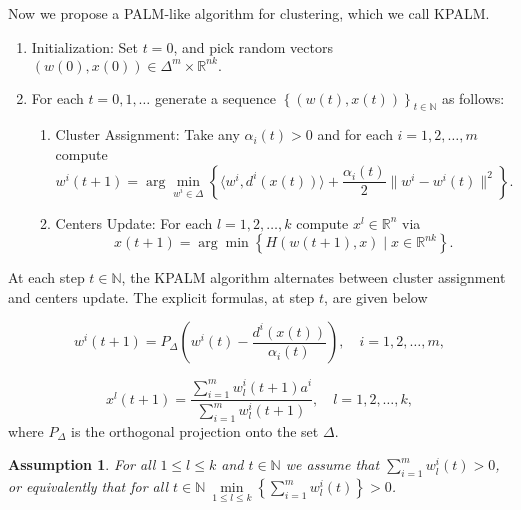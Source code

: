 \documentclass[11pt]{article}
\numberwithin{equation}{section}
\newtheorem{assumption}{Assumption}
\begin{document}
Now we propose a PALM-like algorithm for clustering, which we call KPALM.
\begin{enumerate}[(1)]
	\item Initialization: Set $t=0$, and pick random vectors $(w(0),x(0)) \in \Delta^m \times \mathbb{R}^{nk} .$

	\item For each $t=0,1, \ldots$ generate a sequence $\left\lbrace(w(t),x(t))\right\rbrace_{t \in \mathbb{N}}$ as follows:
	\begin{enumerate}[(2.1)]
		\item Cluster Assignment: Take any $\alpha_i(t) > 0$ and for each $i=1, 2, \ldots ,m$ compute
		\begin{equation}
			w^i(t+1) = \arg\min\limits_{w^i \in \Delta} \left\lbrace \langle w^i , d^i(x(t)) \rangle + \frac{\alpha_i(t)}{2} \|w^i - w^i(t)\|^2 \right\rbrace . \label{StateEq5}
		\end{equation}
		
		\item Centers Update: For each $l=1, 2, \ldots ,k$ compute $x^l \in \mathbb{R}^n$ via
		\begin{equation}
			x(t+1) = \arg\min \left\lbrace H(w(t+1), x) \mid x \in \mathbb{R}^{nk} \right\rbrace . \label{StateEq6}
		\end{equation}
	\end{enumerate}
\end{enumerate}

\newpage

At each step $t \in \mathbb{N}$, the KPALM algorithm alternates between cluster assignment and centers update. The explicit formulas, at step $t$, are given below

\begin{equation}
w^i(t+1) = P_{\Delta} \left(w^i(t) - \frac{d^i(x(t))}{\alpha_i(t)}\right) , \quad i=1, 2, \ldots ,m , \label{StateEq7}
\end{equation}

\begin{equation}
x^l(t+1) = \frac{\sum_{i=1}^{m} w^i_l(t+1) a^i}{\sum_{i=1}^{m} w^i_l(t+1)} , \quad l=1, 2, \ldots ,k , \label{StateEq8}
\end{equation}
where $P_{\Delta}$ is the orthogonal projection onto the set $\Delta$.

\begin{assumption} \label{StateEq17}
For all $1 \leq l \leq k$ and $t \in \mathbb{N}$ we assume that $\sum\limits_{i=1}^{m} w^i_l(t) > 0$, or equivalently that for all $t \in \mathbb{N} \: \min\limits_{1 \leq l \leq k} \left\lbrace \sum\limits_{i=1}^{m} w^i_l(t) \right\rbrace > 0$.
\end{assumption}
	
\end{document}
